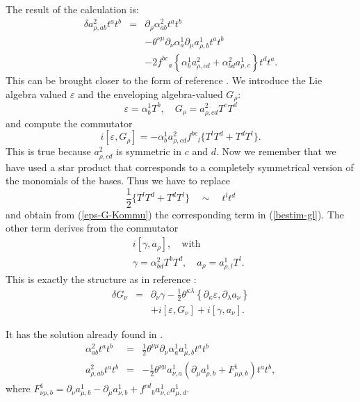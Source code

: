 \documentclass[a4paper,11pt]{article}
\def\nn{\nonumber }
\def\la{\lambda}
\def\ka{\kappa}
\def\ve{\varepsilon}
\def\pat{\partial}
\begin{document}
The result of the calculation is:
\begin{eqnarray}
\label{bestim-gl}
  \delta a^{2}_{\rho,ab}t^at^b&=&\pat_{\rho}\alpha^{2}_{ab}t^at^b\nn\\
  &&-\theta^{\nu\mu}\pat_{\nu}\alpha^{1}_{a}\pat_{\mu}a^{1}_{\rho,b}t^at^b\nn\\
  &&-2f^{bc}{}_a\left\{\alpha^{1}_{b}a^{2}_{\rho,cd}+\alpha^{2}_{bd}a^{1}_{\rho,c}\right\}t^dt^a.
\end{eqnarray}
This can be brought closer to the form of reference \cite{MSSW}.
We introduce the Lie algebra valued $\ve$ and the enveloping algebra-valued
$G_{\rho}$:  \begin{equation}
\label{eps-G}
  \ve=\alpha^{1}_bT^b,\quad G_{\rho}=a^{2}_{\rho,cd}T^cT^d
\end{equation}
and compute the commutator 
\begin{equation}
\label{eps-G-Kommu}
  i[\ve,G_{\rho}]=-\alpha^{1}_ba^2_{\rho,cd}f^{bc}{}_l\{T^lT^d+T^dT^l\}.
\end{equation}
This is true because $a^{2}_{\rho,cd}$ is symmetric in $c$ and $d$. Now 
we remember that we have used a star product that corresponds
to a completely symmetrical version of the monomials of the 
bases. Thus we have to replace 
\begin{equation} 
  \frac{1}{2}\{T^lT^d+T^dT^l\}\quad\sim\quad t^lt^d
\end{equation}
and obtain from (\ref{eps-G-Kommu}) the corresponding term in (\ref{bestim-gl}). The other
term derives from the commutator 
\begin{eqnarray}
  &&i[\gamma,a_{\rho}],\quad\mbox{with}\nn\\
  &&\gamma=\alpha^{2}_{bd}T^bT^d,\quad a_{\rho}=a^1_{\rho,l}T^l.
\end{eqnarray}
This is exactly the structure as in reference \cite{MSSW}:
\begin{eqnarray}
  \delta G_{\nu} &=& \pat_{\nu}\gamma 
- \frac{1}{2}\theta^{\ka\la}\left\{\pat_{\ka} \ve , \pat_{\la} a_{\nu}\right\}\nn\\
  &&+ i[\ve,G_{\nu}]+i[\gamma,a_{\nu}].
\end{eqnarray}                                

It has the solution already found in \cite{MSSW,SW}.
\begin{eqnarray}
\label{solution}
  \alpha^2_{ab}t^at^b&=&\frac{1}{2}\theta^{\nu\mu}\pat_{\nu}\alpha^1_aa^1_{\mu,b}t^at^b\nn\\
  a^2_{\rho,ab}t^at^b&=&-\frac{1}{2}\theta^{\nu\mu}a^1_{\nu,a}(\pat_{\mu}a_{\rho,b}^1+F^1_{\mu\rho,b})t^at^b,
\end{eqnarray}
where $F_{\nu\rho,b}^1=\pat_{\nu}a_{\mu,b}^1-\pat_{\mu}a_{\nu,b}^1+f^{cd}{}_{b}a_{\nu,c}^1a_{\mu,d}^1$.
\end{document}
